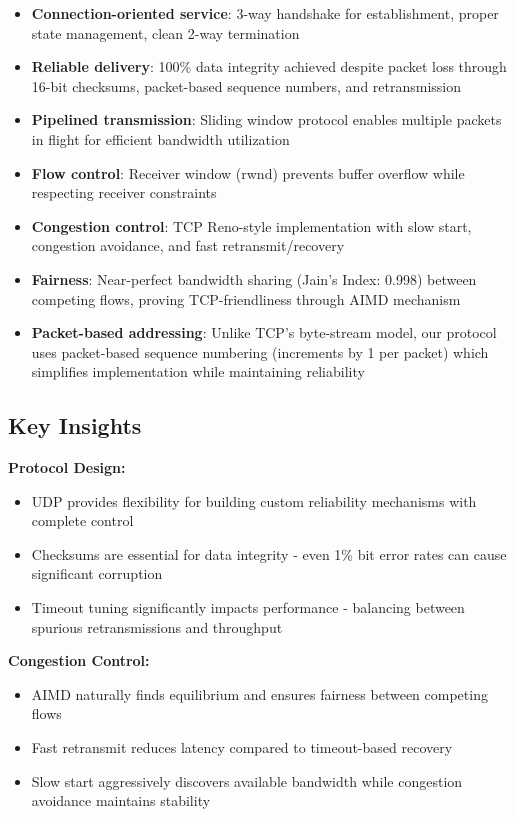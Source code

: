 \documentclass[11pt,a4paper]{article}
\begin{document}
\begin{itemize}
    \item \textbf{Connection-oriented service}: 3-way handshake for establishment, proper state management, clean 2-way termination
    \item \textbf{Reliable delivery}: 100\% data integrity achieved despite packet loss through 16-bit checksums, packet-based sequence numbers, and retransmission
    \item \textbf{Pipelined transmission}: Sliding window protocol enables multiple packets in flight for efficient bandwidth utilization
    \item \textbf{Flow control}: Receiver window (rwnd) prevents buffer overflow while respecting receiver constraints
    \item \textbf{Congestion control}: TCP Reno-style implementation with slow start, congestion avoidance, and fast retransmit/recovery
    \item \textbf{Fairness}: Near-perfect bandwidth sharing (Jain's Index: 0.998) between competing flows, proving TCP-friendliness through AIMD mechanism
    \item \textbf{Packet-based addressing}: Unlike TCP's byte-stream model, our protocol uses packet-based sequence numbering (increments by 1 per packet) which simplifies implementation while maintaining reliability
\end{itemize}

\subsection{Key Insights}

\textbf{Protocol Design:}
\begin{itemize}
    \item UDP provides flexibility for building custom reliability mechanisms with complete control
    \item Checksums are essential for data integrity - even 1\% bit error rates can cause significant corruption
    \item Timeout tuning significantly impacts performance - balancing between spurious retransmissions and throughput
\end{itemize}

\textbf{Congestion Control:}
\begin{itemize}
    \item AIMD naturally finds equilibrium and ensures fairness between competing flows
    \item Fast retransmit reduces latency compared to timeout-based recovery
    \item Slow start aggressively discovers available bandwidth while congestion avoidance maintains stability
\end{itemize}
\end{document}
